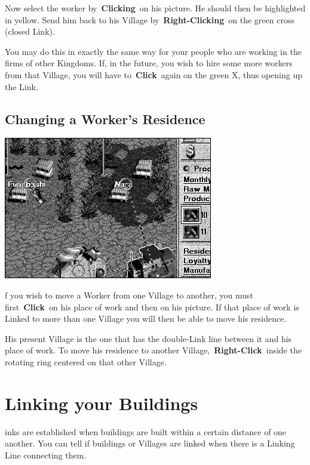 Now select the worker by \textbf{Clicking} on his picture. He should then be highlighted in yellow. Send him back to his Village by \textbf{Right-Clicking} on the green cross (closed Link).

You may do this in exactly the same way for your people who are working in the firms of other Kingdoms. If, in the future, you wish to hire some more workers from that Village, you will have to \textbf{Click} again on the green X, thus opening up the Link.

\subsection{Changing a Worker’s Residence}


\begin{center}
	\includegraphics[width=0.7\linewidth]{Iresidencechange}
\end{center}

f you wish to move a Worker from one Village to another, you must first \textbf{Click} on his place of work and then on his picture. If that place of work is Linked to more than one Village you will then be able to move his residence.

His present Village is the one that has the double-Link line between it and his place of work. To move his residence to another Village, \textbf{Right-Click} inside the rotating ring centered on that other Village.

\section{Linking your Buildings}


inks are established when buildings are built within a certain distance of one another. You can tell if buildings or Villages are linked when there is a Linking Line connecting them.

